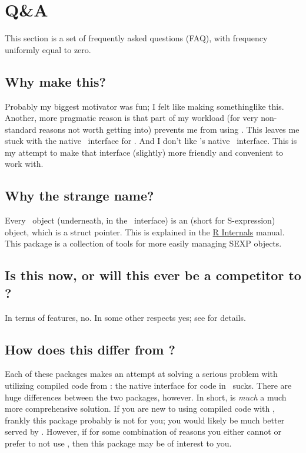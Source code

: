 \section{Q\&A}

This section is a set of frequently asked questions (FAQ), with frequency uniformly
equal to zero.


\subsection{Why make this?}
Probably my biggest motivator was fun; I felt like making somethinglike this.  
Another, more pragmatic reason is that part of my workload (for very 
non-standard reasons not worth getting into) prevents me from using .  
This leaves me stuck with the native \C\ interface for \R.  And I don't like 
\R's native \C\ interface.  This is my attempt to make that interface (slightly) 
more friendly and convenient to work with.


\subsection{Why the strange name?}
Every \R\ object (underneath, in the \C\ interface) is an  (short for
S-expression) object, which is a struct pointer.  This is explained in the
\href{http://cran.r-project.org/doc/manuals/R-ints.html#SEXPs}{R Internals} 
manual.  This package is a collection of tools for more easily managing SEXP 
objects.


\subsection{Is this now, or will this ever be a competitor to ?}
In terms of features, no.  In some other respects yes; see  for
details.


\subsection{How does this differ from ?}\label{sec:rcppdiffs}
Each of these packages makes an attempt at solving a serious problem with utilizing compiled
code from \R: the native interface for  code in \R\ sucks.  There are huge 
differences between the two packages, however. In short,  is \emph{much} a much 
more comprehensive solution.  If you are new to using compiled code with \R, frankly this 
package probably is not for you; you would likely be much better served by .  
However, if for some combination of reasons you either cannot or prefer to not use 
, then this package may be of interest to you.

